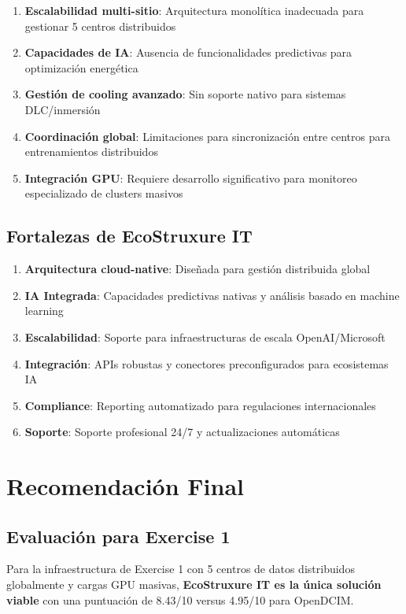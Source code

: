 \documentclass[12pt,a4paper]{article}
\begin{document}
\begin{enumerate}
    \item \textbf{Escalabilidad multi-sitio}: Arquitectura monolítica inadecuada para gestionar 5 centros distribuidos
    \item \textbf{Capacidades de IA}: Ausencia de funcionalidades predictivas para optimización energética
    \item \textbf{Gestión de cooling avanzado}: Sin soporte nativo para sistemas DLC/inmersión
    \item \textbf{Coordinación global}: Limitaciones para sincronización entre centros para entrenamientos distribuidos
    \item \textbf{Integración GPU}: Requiere desarrollo significativo para monitoreo especializado de clusters masivos
\end{enumerate}

\subsection{Fortalezas de EcoStruxure IT}

\begin{enumerate}
    \item \textbf{Arquitectura cloud-native}: Diseñada para gestión distribuida global
    \item \textbf{IA Integrada}: Capacidades predictivas nativas y análisis basado en machine learning
    \item \textbf{Escalabilidad}: Soporte para infraestructuras de escala OpenAI/Microsoft
    \item \textbf{Integración}: APIs robustas y conectores preconfigurados para ecosistemas IA
    \item \textbf{Compliance}: Reporting automatizado para regulaciones internacionales
    \item \textbf{Soporte}: Soporte profesional 24/7 y actualizaciones automáticas
\end{enumerate}

\section{Recomendación Final}

\subsection{Evaluación para Exercise 1}

Para la infraestructura de Exercise 1 con 5 centros de datos distribuidos globalmente y cargas GPU masivas, \textbf{EcoStruxure IT es la única solución viable} con una puntuación de 8.43/10 versus 4.95/10 para OpenDCIM.
\end{document}
